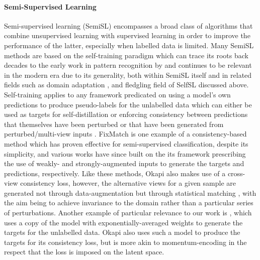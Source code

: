 \paragraph{Semi-Supervised Learning}  
Semi-supervised learning (SemiSL) encompasses a broad class of algorithms that combine unsupervised
learning with supervised learning in order to improve the performance of the latter, especially
when labelled data is limited.
%
Many SemiSL methods are based on the self-training paradigm which can trace its roots back decades
to the early work in pattern recognition by \cite{scudder1965probability} and continues to be
relevant in the modern era due to its generality, both within SemiSL itself and in related fields
such as domain adaptation \citep{ganin2016domain}, and fledgling field of SelfSL
\citep{caron2021emerging} discussed above.
%
Self-training applies to any framework predicated on using a model's own predictions to produce
pseudo-labels for the unlabelled data which can either be used as targets for self-distillation
\citep{xie2020self} or enforcing consistency between predictions that themselves have been
perturbed \citep{bachman2014learning, xie2020self} or that have been generated from
perturbed/multi-view inputs \citep{sohn2020fixmatch}.
%
FixMatch \citep{sohn2020fixmatch} is one example of a consistency-based method which has proven
effective for semi-supervised classification, despite its simplicity, and various works
\citep{gong2021alphamatch, lienen2021credal} have since built on the its framework prescribing the
use of weakly- and strongly-augmented inputs to generate the targets and predictions, respectively.
%
Like these methods, Okapi also makes use of a cross-view consistency loss, however, the alternative
views for a given sample are generated not through data-augmentation but through statistical
matching \citep{rosenbaum1983central}, with the aim being to achieve invariance to the domain
rather than a particular series of perturbations.
%
Another example of particular relevance to our work is \cite{tarvainen2017mean}, which uses a copy
of the model with exponentially-averaged weights to generate the targets for the unlabelled data.
Okapi also uses such a model to produce the targets for its consistency loss, but is more akin to
momentum-encoding \citep{he2020momentum} in the respect that the loss is imposed on the latent
space.

